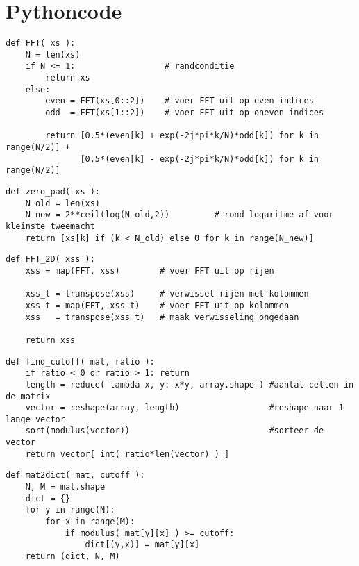 \chapter{Pythoncode}

\begin{lstlisting}[label=fft,float=h!,caption={FFT algoritme in Python, voert de pseudocode uit zoals in sectie~\ref{fft_sec}}]
def FFT( xs ):
    N = len(xs)
    if N <= 1:                  # randconditie
        return xs
    else:
        even = FFT(xs[0::2])    # voer FFT uit op even indices
        odd  = FFT(xs[1::2])    # voer FFT uit op oneven indices

        return [0.5*(even[k] + exp(-2j*pi*k/N)*odd[k]) for k in range(N/2)] + 
               [0.5*(even[k] - exp(-2j*pi*k/N)*odd[k]) for k in range(N/2)]
\end{lstlisting}

\begin{lstlisting}[label=zeropad,float=h!,caption={Zero-padding algoritme in Python, voegt nullen toe tot een tweemacht is bereikt}]
def zero_pad( xs ):
    N_old = len(xs)
    N_new = 2**ceil(log(N_old,2))         # rond logaritme af voor kleinste tweemacht
    return [xs[k] if (k < N_old) else 0 for k in range(N_new)]
\end{lstlisting}

\begin{lstlisting}[label=fft2d,float=h!,caption=2-Dimensionaal FFT algoritme]
def FFT_2D( xss ):
    xss = map(FFT, xss)        # voer FFT uit op rijen

    xss_t = transpose(xss)     # verwissel rijen met kolommen
    xss_t = map(FFT, xss_t)    # voer FFT uit op kolommen
    xss   = transpose(xss_t)   # maak verwisseling ongedaan 

    return xss
\end{lstlisting}

\begin{lstlisting}[label=cutoff,float=h!,caption=Het vinden van een goede cutoff-waarde gegeven een gewenst compressieniveau]
def find_cutoff( mat, ratio ):
	if ratio < 0 or ratio > 1: return
	length = reduce( lambda x, y: x*y, array.shape ) #aantal cellen in de matrix 
	vector = reshape(array, length) 				 #reshape naar 1 lange vector
	sort(modulus(vector)) 							 #sorteer de vector
	return vector[ int( ratio*len(vector) ) ]
\end{lstlisting}

\begin{lstlisting}[label=mat2dict,float=h!,caption=Matrix naar dictionary conversie]
def mat2dict( mat, cutoff ):
	N, M = mat.shape
	dict = {}
	for y in range(N):
		for x in range(M):
			if modulus( mat[y][x] ) >= cutoff:
				dict[(y,x)] = mat[y][x]
	return (dict, N, M)
\end{lstlisting}


